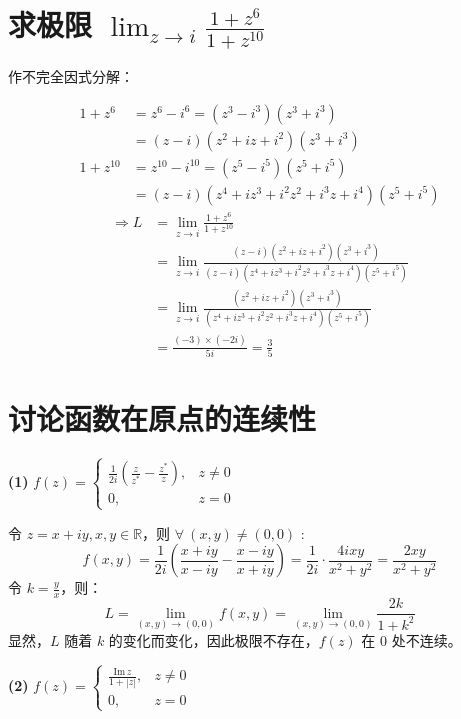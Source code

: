 \documentclass[UTF8]{report}
\def\R{\mathbb{R}}
\def\Im{\mathrm{Im\,}}
\theoremstyle{MyLineTheoremStyle} %
\theoremstyle{MyBlockTheoremStyle} %
\theoremstyle{MySubsubsectionStyle} %
\begin{document}
\section{求极限 $\lim_{z\to i} \frac{1+z^6}{1+z^{10}}$}
作不完全因式分解：

\begin{align*}
    1+z^6 
    &= z^6 - i^6 
    = (z^3 - i^3)(z^3 + i^3) \\
    &= (z - i)(z^2 + iz +i^2)(z^3 + i^3) \\ 
    1+z^{10} 
    &= z^{10} - i^{10} = (z^5-i^5)(z^5+i^5) \\
    &= (z-i)(z^4 + iz^3 + i^2z^2 + i^3z + i^4 )(z^5+i^5)
\end{align*}
\begin{align*}
\Longrightarrow L 
&= \lim_{z\to i} \frac{1+z^6}{1+z^{10}} \\
&= \lim_{z\to i} \frac{(z - i)(z^2 + iz +i^2)(z^3 + i^3)}{(z-i)(z^4 + iz^3 + i^2z^2 + i^3z + i^4 )(z^5+i^5)} \\
&= \lim_{z\to i} \frac{(z^2 + iz +i^2)(z^3 + i^3)}{(z^4 + iz^3 + i^2z^2 + i^3z + i^4 )(z^5+i^5)} \\
&= \frac{(-3)\times (-2i)}{ 5 i} = \frac{3}{5}
\end{align*}

\section{讨论函数在原点的连续性}

\noindent\textbf{(1)} $f(z) = \begin{cases}
    \frac{1}{2i}(\frac{z}{z^*} - \frac{z^*}{z}), & z \neq 0 \\ 
    0, & z = 0
\end{cases}$

令 $z = x + iy, x,y \in \R$，则 $\forall\ (x,y) \ne (0,0)$ :
\begin{equation*}
f(x,y) 
= \frac{1}{2i} \left(\frac{x+iy}{x-iy} - \frac{x-iy}{x+iy}\right) 
= \frac{1}{2i} \cdot \frac{ 4ixy }{x^2 + y^2} = \frac{2xy}{x^2 + y^2} 
\end{equation*}
令 $k = \frac{y}{x}$，则：
\begin{equation*}
L = \lim_{(x,y) \to (0,0)} f(x,y) 
= \lim_{(x,y) \to (0,0)} \frac{2k}{1+k^2}
\end{equation*}
显然，$L$ 随着 $k$ 的变化而变化，因此极限不存在，$f(z)$ 在 $0$ 处不连续。


\noindent\textbf{(2)} $f(z) = \begin{cases}
    \frac{\Im z}{1 + | z |}, & z \neq 0 \\ 
    0, & z = 0
\end{cases}$
\end{document}
